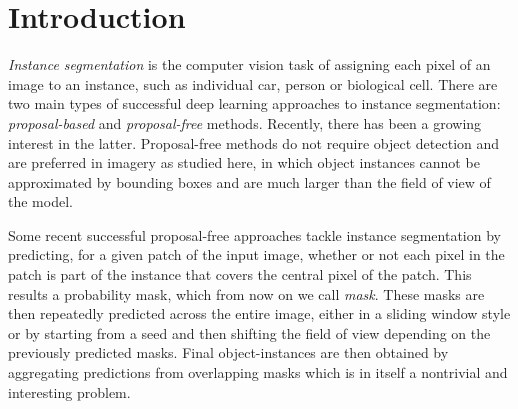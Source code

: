 \section{Introduction}\label{sec:intro}

\emph{Instance segmentation} is the computer vision task of assigning each pixel of an image to an instance, such as individual car, person or biological cell. %
There are two main types of successful deep learning approaches to instance segmentation: \emph{proposal-based} and \emph{proposal-free} methods. 
Recently, there has been a growing interest in the latter. Proposal-free methods do not require object detection and are preferred in imagery as studied here, in which object instances cannot be approximated by bounding boxes and are much larger than the field of view of the model.  

 
Some recent successful proposal-free approaches \cite{januszewski2018high,liu2016multi,meirovitch2016multi} tackle instance segmentation by predicting, for a given patch of the input image, whether or not each pixel in the patch is part of the instance that covers the central pixel of the patch. 
This results a probability mask, which from now on we call \emph{\maskname mask}. These masks are then repeatedly predicted across the entire image, either in a sliding window style or by starting from a seed and then shifting the field of view depending on the previously predicted masks. 
Final object-instances are then obtained by aggregating predictions from overlapping masks which is in itself a nontrivial and interesting problem.

